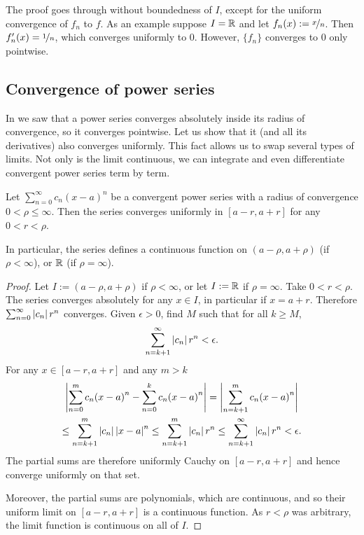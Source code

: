 The proof goes through without boundedness of $I$, except for the
uniform convergence of $f_n$ to $f$.  As an example suppose $I = {\mathbb{R}}$ and let
$f_n(x) := \nicefrac{x}{n}$.  Then $f_n'(x)=\nicefrac{1}{n}$, which
converges uniformly to $0$.  However, $\{f_n\}$ converges to 0 only pointwise.

\subsection{Convergence of power series}

In  we saw that a power series converges
absolutely inside its radius of convergence, so it converges pointwise.
Let us show that it (and all its derivatives) also converges uniformly.
This fact allows us to
swap several types of limits.  Not only is the limit continuous,
we can
integrate and even differentiate convergent power series term by term.

\begin{prop}
Let $\sum_{n=0}^\infty c_n {(x-a)}^n$ be a convergent power series with a radius
of convergence $0 < \rho \leq \infty$.
Then the series converges uniformly
in $[a-r,a+r]$ for any $0 < r < \rho$.

In particular, the series defines a continuous function
on $(a-\rho,a+\rho)$ (if $\rho < \infty$), or ${\mathbb{R}}$ (if $\rho = \infty$).
\end{prop}

\begin{proof}
Let $I := (a-\rho,a+\rho)$ if $\rho < \infty$,
or let $I := {\mathbb{R}}$ if $\rho= \infty$.
Take $0 < r < \rho$.
The series converges absolutely for any $x \in I$,
in particular if $x = a+r$.
Therefore $\sum_{n=0}^\infty \left\lvert {c_n} \right\rvert r^n$ converges.
Given $\epsilon >0$, find $M$ such that for all $k \geq M$,
\begin{equation*}
\sum_{n=k+1}^\infty \left\lvert {c_n} \right\rvert {r}^n < \epsilon .
\end{equation*}
For any $x \in [a-r,a+r]$ and any $m > k$
\begin{multline*}
\left\lvert {\sum_{n=0}^m c_n {(x-a)}^n - 
\sum_{n=0}^k c_n {(x-a)}^n} \right\rvert
=
\left\lvert {\sum_{n=k+1}^m c_n {(x-a)}^n} \right\rvert
\\
\leq
\sum_{n=k+1}^m \left\lvert {c_n} \right\rvert {\left\lvert {x-a} \right\rvert}^n
\leq
\sum_{n=k+1}^m \left\lvert {c_n} \right\rvert {r}^n
\leq
\sum_{n=k+1}^\infty \left\lvert {c_n} \right\rvert {r}^n
<\epsilon.
\end{multline*}
The partial sums are therefore uniformly Cauchy on $[a-r,a+r]$ and
hence converge uniformly on that set.

Moreover, the partial sums are polynomials, which are
continuous, and so their uniform limit on $[a-r,a+r]$
is a continuous function.
As $r < \rho$ was arbitrary, the limit function
is continuous on all of $I$.
\end{proof}

